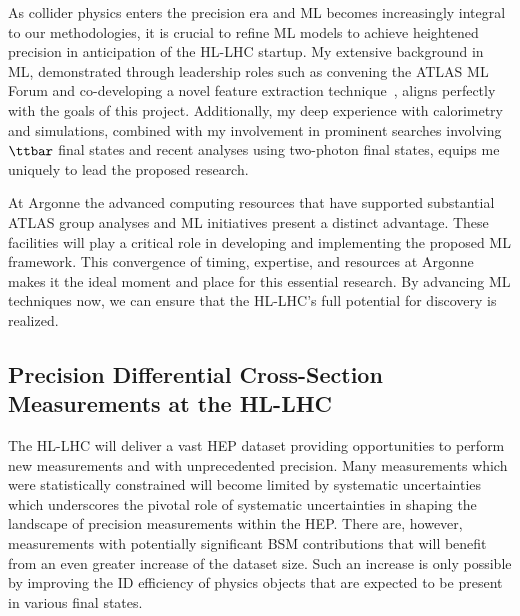 \documentclass[letter, USenglish, 11pt, subfigure]{article}
\begin{document}
As collider physics enters the precision era and ML becomes increasingly integral to our methodologies, it is crucial to refine ML models to achieve heightened precision in anticipation of the HL-LHC startup. My extensive background in ML, demonstrated through leadership roles such as convening the ATLAS ML Forum and co-developing a novel feature extraction technique~\cite{dijetAnom}, aligns perfectly with the goals of this project. Additionally, my deep experience with calorimetry and simulations, combined with my involvement in prominent searches involving $\ttbar$ final states and recent analyses using two-photon final states, equips me uniquely to lead the proposed research.

At Argonne the advanced computing resources that have supported substantial ATLAS group analyses and ML initiatives present a distinct advantage. These facilities will play a critical role in developing and implementing the proposed ML framework. This convergence of timing, expertise, and resources at Argonne makes it the ideal moment and place for this essential research. By advancing ML techniques now, we can ensure that the HL-LHC's full potential for discovery is realized.

\clearpage

\subsection{Precision Differential Cross-Section Measurements at the HL-LHC}
The HL-LHC will deliver a vast HEP dataset providing opportunities to perform new measurements and with unprecedented precision.
Many measurements which were statistically constrained will become limited by systematic uncertainties which underscores the pivotal role of systematic uncertainties in shaping the landscape of precision measurements within the HEP. There are, however, measurements with potentially significant BSM contributions that will benefit from an even greater increase of the dataset size. Such an increase is only possible by improving the ID efficiency of physics objects that are expected to be present in various final states. 
\end{document}

